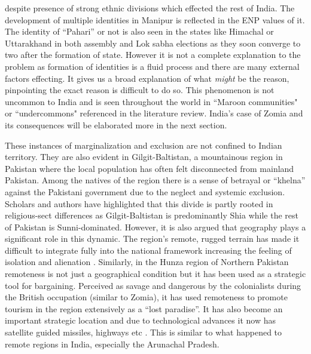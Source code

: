 despite presence of strong ethnic divisions which effected the rest of India. 
The development of multiple identities in Manipur is reflected in the ENP values of it. The identity of ``Pahari'' or not is also seen in the states like Himachal or Uttarakhand in both assembly and Lok sabha elections as they soon converge to two after the formation of state. However it is not a complete explanation to the problem as formation of identities is a fluid process and there are many external factors effecting. It gives us a broad explanation of what \textit{might} be the reason, pinpointing the exact reason is difficult to do so.
This phenomenon is not uncommon to India and is seen throughout the world in ``Maroon communities"  or ``undercommons" referenced in the literature review. India's case of Zomia and its consequences will be elaborated more in the next section. 



 \vspace{0.3cm}

 These instances of marginalization and exclusion are not confined to Indian territory. They are also evident in Gilgit-Baltistan, a mountainous region in Pakistan where the local population has often felt disconnected from mainland Pakistan. Among the natives of the region there is a sense of betrayal or \enquote{khelna} against the Pakistani government due to the neglect and systemic exclusion. Scholars and authors have highlighted that this divide is partly rooted in religious-sect differences as Gilgit-Baltistan is predominantly Shia while the rest of Pakistan is  Sunni-dominated. However, it is also argued that geography plays a significant role in this dynamic. The region's remote, rugged terrain has  made it difficult to integrate fully into the national framework  increasing the feeling of isolation and alienation \citep{ali2019delusional}. Similarly, in the Hunza region of Northern Pakistan  remoteness is not just a geographical condition but it has been used as a strategic tool for bargaining. Perceived as savage and dangerous by the colonialists during the British occupation (similar to Zomia), it has used remoteness to promote tourism in the region extensively as a \enquote{lost paradise}. It has also become an important strategic location and due to technological  advances it now has satellite guided missiles, highways etc \citep{hussain2015remoteness}. This is similar to what happened to remote regions in India, especially the Arunachal Pradesh.

\vspace{0.3cm}

